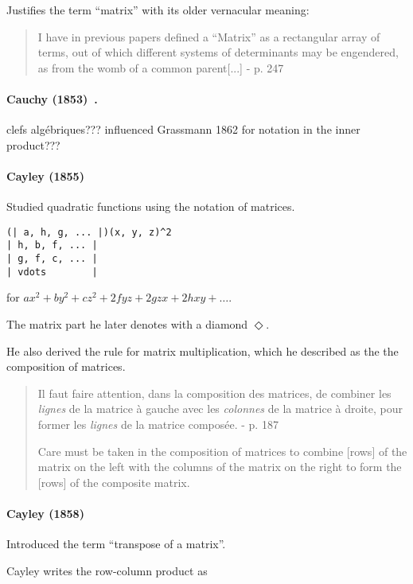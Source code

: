 Justifies the term ``matrix'' with its older vernacular meaning:

\begin{quote}
I have in previous papers defined a ``Matrix'' as a rectangular array of
terms, out of which different systems of determinants may be engendered,
as from the womb of a common parent[...] - p. 247
\end{quote}

\paragraph{Cauchy (1853)~\cite{Cauchy1853}.} clefs algébriques??? influenced Grassmann 1862 for notation in the inner product???


\paragraph{Cayley (1855)~\cite{Cayley1855}}

Studied quadratic functions using the notation of matrices.

\begin{verbatim}
(| a, h, g, ... |)(x, y, z)^2
| h, b, f, ... |
| g, f, c, ... |
| vdots        |
\end{verbatim}

for $ax^2 + by^2 + cz^2 + 2fyz + 2gzx + 2hxy + \dots$.

The matrix part he later denotes with a diamond $\Diamond$.

He also derived the rule for matrix multiplication, which he described as the
the composition of matrices.
\begin{quote}
Il faut faire attention, dans la composition des matrices, de combiner les \textit{lignes}
de la matrice à gauche avec les \textit{colonnes} de la matrice à droite, pour former les
\textit{lignes} de la matrice composée.
- p. 187

Care must be taken in the composition of matrices to combine [rows]
of the matrix on the left with the columns of the matrix on the right to form the
[rows] of the composite matrix.
\end{quote}

\paragraph{Cayley (1858)~\cite{Cayley1858}}

Introduced the term ``transpose of a matrix''.

Cayley writes the row-column product as

